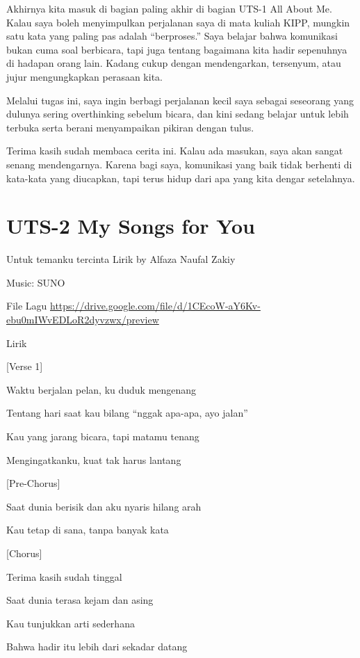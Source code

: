 \documentclass[
  letterpaper,
  DIV=11,
  numbers=noendperiod]{scrreprt}
\begin{document}
Akhirnya kita masuk di bagian paling akhir di bagian UTS-1 All About Me.
Kalau saya boleh menyimpulkan perjalanan saya di mata kuliah KIPP,
mungkin satu kata yang paling pas adalah ``berproses.'' Saya belajar
bahwa komunikasi bukan cuma soal berbicara, tapi juga tentang bagaimana
kita hadir sepenuhnya di hadapan orang lain. Kadang cukup dengan
mendengarkan, tersenyum, atau jujur mengungkapkan perasaan kita.

Melalui tugas ini, saya ingin berbagi perjalanan kecil saya sebagai
seseorang yang dulunya sering overthinking sebelum bicara, dan kini
sedang belajar untuk lebih terbuka serta berani menyampaikan pikiran
dengan tulus.

Terima kasih sudah membaca cerita ini. Kalau ada masukan, saya akan
sangat senang mendengarnya. Karena bagi saya, komunikasi yang baik tidak
berhenti di kata-kata yang diucapkan, tapi terus hidup dari apa yang
kita dengar setelahnya.


\chapter{UTS-2 My Songs for You}\label{uts-2-my-songs-for-you}

Untuk temanku tercinta Lirik by Alfaza Naufal Zakiy

Music: SUNO

File Lagu
\url{https://drive.google.com/file/d/1CEcoW-aY6Kv-ebu0mIWvEDLoR2dyvzwx/preview}

Lirik

{[}Verse 1{]}

Waktu berjalan pelan, ku duduk mengenang

Tentang hari saat kau bilang ``nggak apa-apa, ayo jalan''

Kau yang jarang bicara, tapi matamu tenang

Mengingatkanku, kuat tak harus lantang

{[}Pre-Chorus{]}

Saat dunia berisik dan aku nyaris hilang arah

Kau tetap di sana, tanpa banyak kata

{[}Chorus{]}

Terima kasih sudah tinggal

Saat dunia terasa kejam dan asing

Kau tunjukkan arti sederhana

Bahwa hadir itu lebih dari sekadar datang
\end{document}
